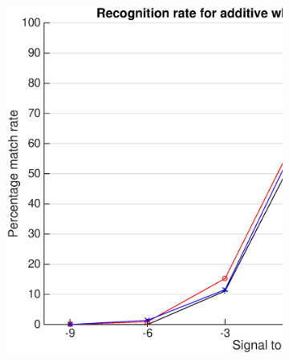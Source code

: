\documentclass[12pt,a4paper,twoside,openright]{report}
\begin{document}
\begin{figure}[p]
    \centering

    \begin{subfigure}{\textwidth}
      \includegraphics[width=\textwidth]{./figs/gaussian_philips_results.eps}
    \end{subfigure}

    \vspace{10mm}


\end{figure}
\end{document}
